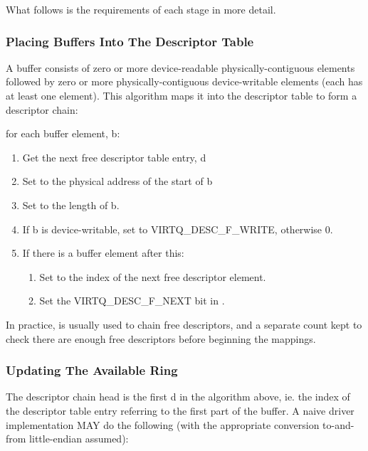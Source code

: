 What follows is the requirements of each stage in more detail.

\subsubsection{Placing Buffers Into The Descriptor Table}\label{sec:Basic Facilities of a Virtio Device / Virtqueues / Supplying Buffers to The Device / Placing Buffers Into The Descriptor Table}

A buffer consists of zero or more device-readable physically-contiguous
elements followed by zero or more physically-contiguous
device-writable elements (each has at least one element). This
algorithm maps it into the descriptor table to form a descriptor
chain:

for each buffer element, b:

\begin{enumerate}
\item Get the next free descriptor table entry, d
\item Set  to the physical address of the start of b
\item Set  to the length of b.
\item If b is device-writable, set  to VIRTQ_DESC_F_WRITE,
    otherwise 0.
\item If there is a buffer element after this:
    \begin{enumerate}
    \item Set  to the index of the next free descriptor
      element.
    \item Set the VIRTQ_DESC_F_NEXT bit in .
    \end{enumerate}
\end{enumerate}

In practice,  is usually used to chain free
descriptors, and a separate count kept to check there are enough
free descriptors before beginning the mappings.

\subsubsection{Updating The Available Ring}\label{sec:Basic Facilities of a Virtio Device / Virtqueues / Supplying Buffers to The Device / Updating The Available Ring}

The descriptor chain head is the first d in the algorithm
above, ie. the index of the descriptor table entry referring to the first
part of the buffer.  A naive driver implementation MAY do the following (with the
appropriate conversion to-and-from little-endian assumed):

